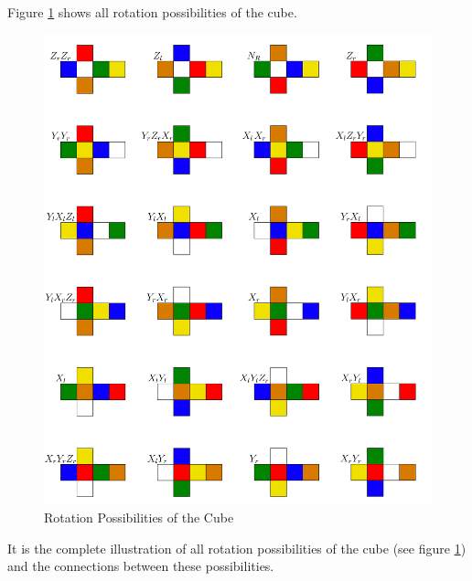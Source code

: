 \documentclass[12pt,a4paper]{article}
\theoremstyle{custom}
\begin{document}
Figure \ref{ImageCubeRotationAllSides} shows all rotation possibilities of the cube. 

\begin{figure}[H]
\centering
\includegraphics[scale=0.06]{AllRotations.png}
\caption{Rotation Possibilities of the Cube}
\label{ImageCubeRotationAllSides}
\end{figure}
\newpage
It is the complete illustration of all rotation possibilities of the cube (see figure \ref{ImageCubeRotationAllSides}) and the connections between these possibilities.
\end{document}
